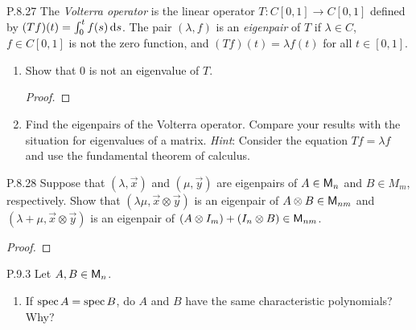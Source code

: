 \documentclass{../homework}
\begin{document}
\begin{problems}
\item[P.8.27] The \textit{Volterra operator} is the linear operator
  \(T \colon C[0, 1] \to C[0, 1]\) defined by
  \((Tf)(t) = \int_0^t f(s) \mathop{}\! \mathrm d s\).  The pair \((\lambda, f)\) is an
  \emph{eigenpair} of \(T\) if \(\lambda \in C\), \(f \in C[0, 1]\) is
  not the zero function, and \((Tf)(t) = \lambda f(t)\) for all
  \(t \in [0, 1]\).
  \begin{enumerate}
  \item Show that \(0\) is not an eigenvalue of \(T\).

    \begin{solution}
      \begin{proof}

      \end{proof}
    \end{solution}

  \item Find the eigenpairs of the Volterra operator.  Compare your
    results with the situation for eigenvalues of a matrix.
    \textit{Hint}: Consider the equation \(Tf = \lambda f\) and use
    the fundamental theorem of calculus.

    \begin{solution}

    \end{solution}
  \end{enumerate}

\item[P.8.28] Suppose that \((\lambda, \vec x)\) and \((\mu, \vec y)\)
  are eigenpairs of \(A \in \mathsf{M}_n\) and \(B \in M_m\), respectively.
  Show that \((\lambda \mu, \vec x \otimes \vec y)\) is an eigenpair
  of \(A \otimes B \in \mathsf{M}_{nm}\) and
  \((\lambda+\mu, \vec x \otimes \vec y)\) is an eigenpair of
  \(\left( {A \otimes I_m} \right) + \left( {I_n \otimes B} \right) \in \mathsf{M}_{nm}\).

  \begin{solution}
    \begin{proof}

    \end{proof}
  \end{solution}

\item[P.9.3] Let \(A, B \in \mathsf{M}_n\).
  \begin{enumerate}
  \item If \(\operatorname{spec} A = \operatorname{spec} B\), do \(A\) and \(B\) have the same
    characteristic polynomials?  Why?

    \begin{solution}


\end{solution}
\end{enumerate}
\end{problems}
\end{document}
